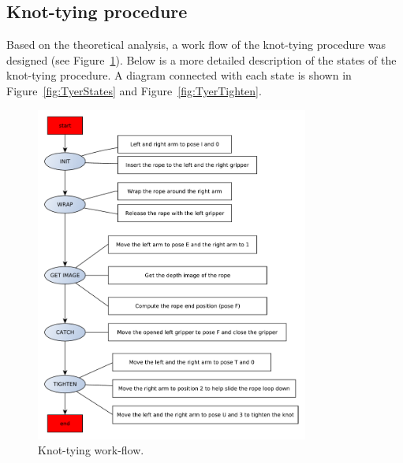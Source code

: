     \subsection{Knot-tying procedure}


        Based on the theoretical analysis, a work flow of the knot-tying procedure was designed (see Figure~\ref{fig:TyerWorkflow}). Below is a more detailed description of the states of the knot-tying procedure. A diagram connected with each state is shown in Figure~\ref{fig:TyerStates} and Figure~\ref{fig:TyerTighten}.

        \begin{figure}
        \includegraphics[width=0.8\textwidth]{TyerWorkflow.pdf}
        \centering
        \caption{Knot-tying work-flow.}
        \label{fig:TyerWorkflow}
        \end{figure}

